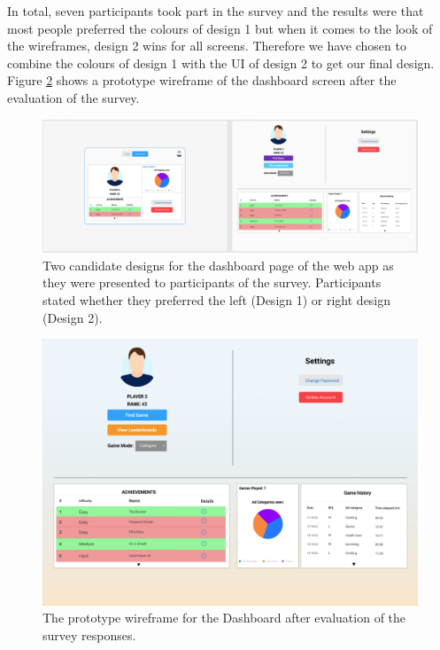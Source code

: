 \documentclass{l4proj}
\begin{document}
In total, seven participants took part in the survey and the results were that most people preferred the colours of design 1 but when it comes to the look of the wireframes, design 2 wins for all screens. Therefore we have chosen to combine the colours of design 1 with the UI of design 2 to get our final design. Figure \ref{fig:finaldesign} shows a prototype wireframe of the dashboard screen after the evaluation of the survey.
\begin{figure}
    \centering
    \includegraphics[width=1\linewidth]{images/Dashboard.png}    

    \caption{Two candidate designs for the dashboard page of the web app as they were presented to participants of the survey. Participants stated whether they preferred the left (Design 1) or right design (Design 2). }

    \label{fig:wireframe} 
\end{figure}

\begin{figure}
    \centering
    \includegraphics[width=1\linewidth]{images/DashboardFinal.png}    

    \caption{The prototype wireframe for the Dashboard after evaluation of the survey responses. }

    \label{fig:finaldesign} 
\end{figure}
\end{document}

